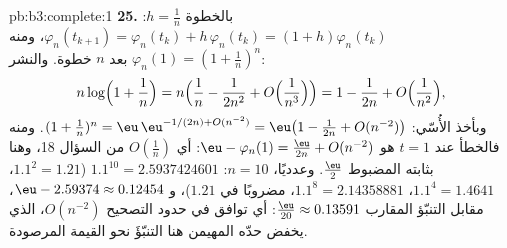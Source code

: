 \begin{solution}{pb:b3:complete:1}
\textbf{25.} بالخطوة $h = \frac1n$: $\varphi_n(t_{k+1}) =
\varphi_n(t_k) + h\,\varphi_n(t_k) = (1 + h)\varphi_n(t_k)$، ومنه $\varphi_n(1) = (1 + \frac1n)^n$ بعد
$n$ خطوة. والنشر:
\[
n\log\Bigl(1 + \frac1n\Bigr)
= n\Bigl(\frac1n - \frac1{2n^2} + O\Bigl(\frac1{n^3}\Bigr)
\Bigr) = 1 - \frac1{2n} + O\Bigl(\frac1{n^2}\Bigr),
\]
وبأخذ الأُسّي: $(1 + \frac1n)^n = \eu\,\eu^{-1/(2n) +
O(n^{-2})} = \eu\bigl(1 - \frac1{2n} + O(n^{-2})\bigr)$. ومنه فالخطأ عند $t = 1$ هو $\eu - \varphi_n(1) =
\frac{\eu}{2n} + O(n^{-2})$:
أي $O(\frac1n)$ من السؤال 18، وهنا بثابته المضبوط $\frac\eu2$.
وعدديًا، $n =
10$: $1.1^{10} = 2.5937424601$ ($1.1^2 = 1.21$، $1.1^4 =
1.4641$، $1.1^8 = 2.14358881$،
مضروبًا في $1.21$)، و $\eu -
2.59374 \approx 0.12454$، مقابل التنبّؤ المقارب $\frac{\eu}{20} \approx 0.13591$:
أي توافق في حدود التصحيح $O(n^{-2})$، الذي يخفض حدّه المهيمن
هنا التنبّؤَ نحو القيمة المرصودة.
\end{solution}
